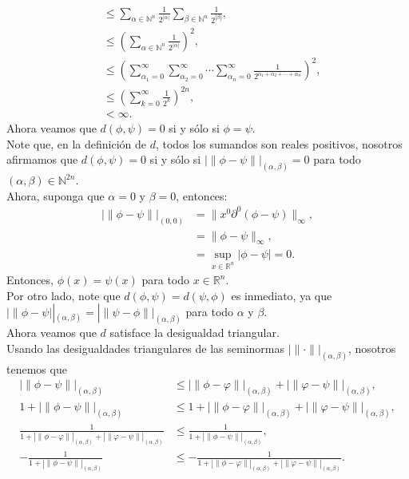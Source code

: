\begin{homeworkProblem}
\begin{solution}
\begin{align*}
			&\leq \sum_{\alpha\in\mathbb{N}^{n}}\frac{1}{2^{|\alpha|}} \sum_{\beta\in\mathbb{N}^{n}}\frac{1}{2^{|\beta|}},\\
			&\leq \left(\sum_{\alpha\in\mathbb{N}^{n}}\frac{1}{2^{|\alpha|}}\right)^2,\\
			&\leq\left( \sum_{\alpha_1=0}^{\infty}\sum_{\alpha_2=0}^{\infty}\cdots\sum_{\alpha_n=0}^{\infty}\frac{1}{2^{\alpha_1+\alpha_2+\cdots+\alpha_n}}\right)^2,\\
			&\leq\left(\sum_{k=0}^{\infty}\frac{1}{2^k}\right)^{2n},\\
			&<\infty.
    \end{align*}
    Ahora veamos que $d(\phi,\psi)=0$ si y sólo si $\phi=\psi$.\\
		Note que, en la definición de $d$, todos los sumandos son reales positivos, nosotros afirmamos que $d(\phi,\psi)=0$ si y sólo si $|\|\phi-\psi\||_{(\alpha,\beta)}=0$ para todo $(\alpha,\beta)\in\mathbb{N}^{2n}$.\\
		Ahora, suponga que $\alpha=0$ y $\beta=0$, entonces:
		\begin{align*}
			|\|\phi-\psi\||_{(0,0)}&=\|x^{0}\partial^{0}(\phi-\psi)\|_{\infty},\\
			&=\|\phi-\psi\|_{\infty},\\
			&=\sup_{x\in\mathbb{R}^n}|\phi-\psi|=0.
		\end{align*}
		Entonces, $\phi(x)=\psi(x)$ para todo $x\in\mathbb{R}^n$.\\
    Por otro lado, note que $d(\phi,\psi)=d(\psi,\phi)$ es inmediato, ya que $|\|\phi-\psi||_{(\alpha,\beta)}=|\|\psi-\phi\||_{(\alpha,\beta)}$ para todo $\alpha$ y $\beta$.\\
    Ahora veamos que $d$ satisface la desigualdad triangular.\\
		Usando las desigualdades triangulares de las seminormas $|\|\cdot\||_{(\alpha,\beta)}$, nosotros tenemos que
		\begin{align*}
			|\|\phi-\psi\||_{(\alpha,\beta)}&\leq |\|\phi-\varphi\||_{(\alpha,\beta)}+|\|\varphi-\psi\||_{(\alpha,\beta)},\\
			1+|\|\phi-\psi\||_{(\alpha,\beta)}&\leq 1+ |\|\phi-\varphi\||_{(\alpha,\beta)}+|\|\varphi-\psi\||_{(\alpha,\beta)},\\
			\frac{1}{1+ |\|\phi-\varphi\||_{(\alpha,\beta)}+|\|\varphi-\psi\||_{(\alpha,\beta)}}&\leq \frac{1}{1+|\|\phi-\psi\||_{(\alpha,\beta)}},\\
			-\frac{1}{1+|\|\phi-\psi\||_{(\alpha,\beta)}}&\leq -\frac{1}{1+ |\|\phi-\varphi\||_{(\alpha,\beta)}+|\|\varphi-\psi\||_{(\alpha,\beta)}}.

\end{align*}
\end{solution}
\end{homeworkProblem}
